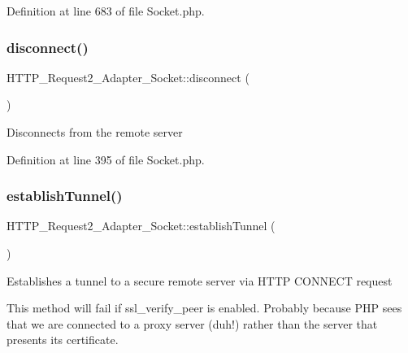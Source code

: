 Definition at line 683 of file Socket.\+php.

\mbox{\label{classHTTP__Request2__Adapter__Socket_a20cf7acb1fb9f0f80929ec368fc4ff8f}} 
\subsubsection{\texorpdfstring{disconnect()}{disconnect()}}
{\footnotesize\ttfamily H\+T\+T\+P\+\_\+\+Request2\+\_\+\+Adapter\+\_\+\+Socket\+::disconnect (\begin{DoxyParamCaption}{ }\end{DoxyParamCaption})\hspace{0.3cm}{\ttfamily [protected]}}

Disconnects from the remote server 

Definition at line 395 of file Socket.\+php.

\mbox{\label{classHTTP__Request2__Adapter__Socket_a924bbeb198c174580c109eb563079296}} 
\subsubsection{\texorpdfstring{establish\+Tunnel()}{establishTunnel()}}
{\footnotesize\ttfamily H\+T\+T\+P\+\_\+\+Request2\+\_\+\+Adapter\+\_\+\+Socket\+::establish\+Tunnel (\begin{DoxyParamCaption}{ }\end{DoxyParamCaption})\hspace{0.3cm}{\ttfamily [protected]}}

Establishes a tunnel to a secure remote server via H\+T\+TP C\+O\+N\+N\+E\+CT request

This method will fail if \textquotesingle{}ssl\+\_\+verify\+\_\+peer\textquotesingle{} is enabled. Probably because P\+HP sees that we are connected to a proxy server (duh!) rather than the server that presents its certificate.

